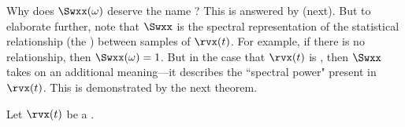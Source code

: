 Why does $\Swxx(\omega)$ deserve the name ?
This is answered by  (next).
But to elaborate further, note that $\Swxx$ is the spectral representation of 
the statistical relationship (the ) between samples of $\rvx(t)$. 
For example, if there is no relationship, then $\Swxx(\omega)=1$.
But in the case that $\rvx(t)$ is , then $\Swxx$ takes on 
an additional meaning---it describes the ``spectral power" present in $\rvx(t)$.
This is demonstrated by the next theorem.

\begin{theorem}
\label{thm:psd_ergodic}
Let $\rvx(t)$ be a .
\end{theorem}

